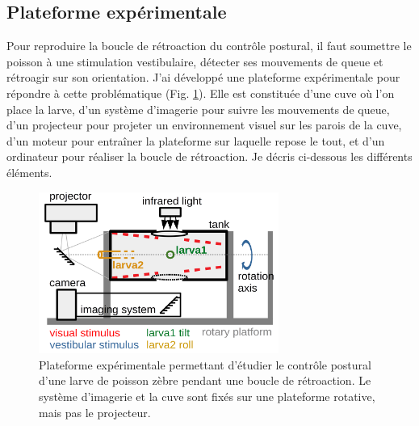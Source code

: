 \subsection{Plateforme expérimentale}

Pour reproduire la boucle de rétroaction du contrôle postural, il faut soumettre le poisson à une stimulation vestibulaire, détecter ses mouvements de queue et rétroagir sur son orientation. J'ai développé une plateforme expérimentale pour répondre à cette problématique (Fig. \ref{FIGexpplatformbehavior}). Elle est constituée d'une cuve où l'on place la larve, d'un système d'imagerie pour suivre les mouvements de queue, d'un projecteur pour projeter un environnement visuel sur les parois de la cuve, d'un moteur pour entraîner la plateforme sur laquelle repose le tout, et d'un ordinateur pour réaliser la boucle de rétroaction. Je décris ci-dessous les différents éléments.

\begin{figure}
    \centering
    \includegraphics[width=0.7\textwidth]{./files/schema_manip.png}
    \caption{Plateforme expérimentale permettant d'étudier le contrôle postural d'une larve de poisson zèbre pendant une boucle de rétroaction. Le système d'imagerie et la cuve sont fixés sur une plateforme rotative, mais pas le projecteur.
    \label{FIGexpplatformbehavior}}
    \end{figure}

